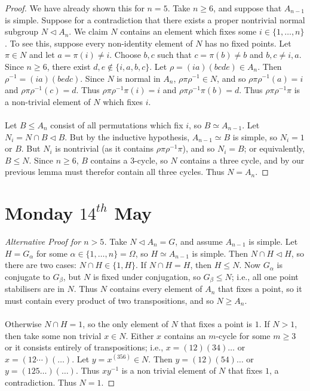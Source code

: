 \documentclass[a4paper,10pt]{article}
\begin{document}
\begin{proof}
We have already shown this for $n = 5$. Take $n \geq 6$, and suppose that $A_{n-1}$ is simple. Suppose for a contradiction that there exists a proper nontrivial normal subgroup $N \triangleleft A_n$. We claim $N$ contains an element which fixes some $i \in \{1, \dots, n\}$. To see this, suppose every non-identity element of $N$ has no fixed points. Let $\pi \in N$ and let $a = \pi(i) \neq i$. Choose $b,c$ such that $c = \pi(b) \neq b$ and $b,c \neq i,a$. Since $n \geq 6$, there exist $d,e \notin \{ i,a,b,c \}$. Let $\rho = (ia)(bcde) \in A_n$. Then $\rho^{-1} = (ia)(bedc)$. Since $N$ is normal in $A_n$, $\rho \pi \rho^{-1} \in N$, and so $\rho \pi \rho^{-1} (a) = i$ and $\rho \pi  \rho^{-1} (c) = d$. Thus $\rho \pi \rho^{-1} \pi (i) = i$ and $\rho \pi \rho^{-1} \pi (b) = d$. Thus $\rho \pi \rho^{-1} \pi$ is a non-trivial element of $N$ which fixes $i$. \\
\\
Let $B \leq A_n$ consist of all permutations which fix $i$, so $B \simeq A_{n-1}$. Let $N_i  = N \cap B \triangleleft B$. But by the inductive hypothesis, $A_{n-1} \simeq B$ is simple, so $N_i = 1$ or $B$. But $N_i$ is nontrivial (as it contains $\rho \pi \rho^{-1} \pi$), and so $N_i = B$; or equivalently, $B \leq N$. Since $n \geq 6$, $B$ contains a $3$-cycle, so $N$ contains a three cycle, and by our previous lemma must therefor contain all three cycles. Thus $N = A_n$. 
\end{proof}



\newpage
\section{Monday $14^{th}$ May}


\begin{proof}[Alternative Proof for $n > 5$]
Take $N \triangleleft A_n = G$, and assume $A_{n-1}$ is simple. Let $H = G_\alpha$ for some $\alpha \in \{1, \dots, n\} = \Omega$, so $H \simeq A_{n-1}$ is simple. Then $N \cap H \triangleleft H$, so there are two cases: $N \cap H \in \{ 1, H \}$. If $N \cap H = H$, then $H \leq N$. Now $G_\alpha$ is conjugate to $G_\beta$, but $N$ is fixed under conjugation, so $G_\beta \leq N$; i.e., all one point stabilisers are in $N$. Thus $N$ contains every element of $A_n$ that fixes a point, so it must contain every product of two transpositions, and so $N \geq A_n$. \\
\\
Otherwise $N \cap H = 1$, so the only element of $N$ that fixes a point is $1$. If $N > 1$, then take some non trivial $x \in N$. Either $x$ contains an $m$-cycle for some $m \geq 3$ or it consists entirely of transpositions; i.e., $x = (12)(34)\dots$ or $x = (12\dotsm)(\dots)$. Let $y = x^{(356)} \in N$. Then $y = (12)(54)\dots$ or $y = (125\dots)(\dots)$. Thus $xy^{-1}$ is a non trivial element of $N$ that fixes $1$, a contradiction. Thus $N  = 1$. 
\end{proof}
\end{document}
